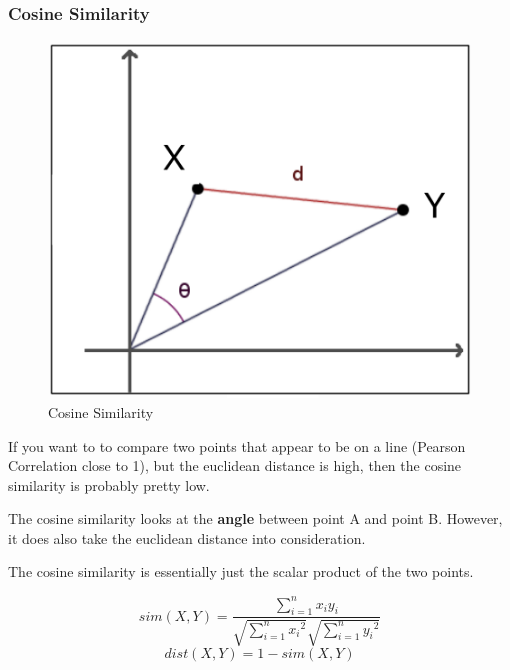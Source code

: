\documentclass[11pt]{article}
\begin{document}
\subsubsection{Cosine Similarity}

\begin{figure}
    \centering
    \includegraphics[keepaspectratio=true,height=14\baselineskip]{cosine_similarity.png}
    \caption{Cosine Similarity}
    \label{fig:cosine_similarity}
\end{figure}

If you want to to compare two points that appear to be on a line (Pearson Correlation close to 1), but the euclidean distance is high, then the cosine similarity is probably pretty low.

The cosine similarity looks at the \textbf{angle} between point A and point B. However, it does also take the euclidean distance into consideration.

\vspace{10px}

The cosine similarity is essentially just the scalar product of the two points.

\vspace{10px}

\begin{equation} \label{eq:sim}
    sim(X,Y) = \frac{\sum^{n}_{i=1}{x_{i} y_{i}}}{\sqrt{\sum^{n}_{i=1}{x_{i}}^2}\sqrt{\sum^{n}_{i=1}{y_{i}}^2}}
\end{equation}
\begin{equation}
    dist(X,Y) = 1 - sim(X,Y)
\end{equation}
\end{document}
